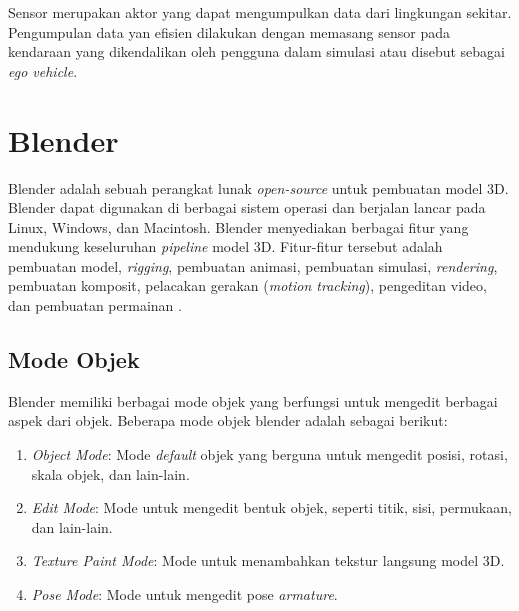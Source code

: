 
Sensor merupakan aktor yang dapat mengumpulkan data dari lingkungan sekitar.
Pengumpulan data yan efisien dilakukan dengan memasang sensor pada kendaraan
yang dikendalikan oleh pengguna dalam simulasi atau disebut sebagai \textit{ego
vehicle}.


\section{Blender \parencite{blender-manual}}

Blender adalah sebuah perangkat lunak \textit{open-source} untuk pembuatan model
3D. Blender dapat digunakan di berbagai sistem operasi dan berjalan lancar pada
Linux, Windows, dan Macintosh. Blender menyediakan berbagai fitur yang mendukung
keseluruhan \textit{pipeline} model 3D. Fitur-fitur tersebut adalah pembuatan
model, \textit{rigging}, pembuatan animasi, pembuatan simulasi,
\textit{rendering}, pembuatan komposit, pelacakan gerakan (\textit{motion
tracking}), pengeditan video, dan pembuatan permainan \parencite{blender-about}.

\subsection{Mode Objek}

Blender memiliki berbagai mode objek yang berfungsi untuk mengedit berbagai
aspek dari objek. Beberapa mode objek blender adalah sebagai berikut:

\begin{enumerate}

    \item \textit{Object Mode}: Mode \textit{default} objek yang berguna untuk
    mengedit posisi, rotasi, skala objek, dan lain-lain.

    \item \textit{Edit Mode}: Mode untuk mengedit bentuk objek, seperti titik,
    sisi, permukaan, dan lain-lain.

    \item \textit{Texture Paint Mode}: Mode untuk menambahkan tekstur langsung
    model 3D.

    \item \textit{Pose Mode}: Mode untuk mengedit pose \textit{armature}.

\end{enumerate}

